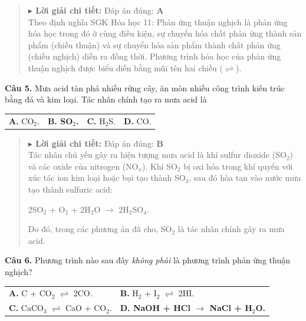 \documentclass[11pt,a4paper]{article}
\begin{document}
\begin{quote}\small
{\color{myBlue}\textbf{$\blacktriangleright$ Lời giải chi tiết:}} Đáp án đúng: \textbf{\color{red} A}\\
Theo định nghĩa SGK Hóa học 11: Phản ứng thuận nghịch là phản ứng hóa học trong đó ở cùng điều kiện, sự chuyển hóa chất phản ứng thành sản phẩm (chiều thuận) và sự chuyển hóa sản phẩm thành chất phản ứng (chiều nghịch) diễn ra đồng thời. Phương trình hóa học của phản ứng thuận nghịch được biểu diễn bằng mũi tên hai chiều ($\rightleftharpoons$).
\end{quote}
\vspace{2pt}

\textbf{Câu 5.} Mưa acid tàn phá nhiều rừng cây, ăn mòn nhiều công trình kiến trúc bằng đá và kim loại. Tác nhân chính tạo ra mưa acid là

\begin{tabularx}{\textwidth}{@{}XXXX@{}}
\textbf{A.} CO$_{2}$. & \textbf{\color{red} B. SO$_{2}$.} & \textbf{C.} H$_{2}$S. & \textbf{D.} CO. \\
\end{tabularx}

\begin{quote}\small
{\color{myBlue}\textbf{$\blacktriangleright$ Lời giải chi tiết:}} Đáp án đúng: \textbf{\color{red} B}\\
Tác nhân chủ yếu gây ra hiện tượng mưa acid là khí sulfur dioxide (SO$_{2}$) và các oxide của nitrogen (NO$_{x}$). Khí SO$_{2}$ bị oxi hóa trong khí quyển với xúc tác ion kim loại hoặc bụi tạo thành SO$_{3}$, sau đó hòa tan vào nước mưa tạo thành sulfuric acid:

2SO$_{2}$ + O$_{2}$ + 2H$_{2}$O $\longrightarrow$ 2H$_{2}$SO$_{4}$.

Do đó, trong các phương án đã cho, SO$_{2}$ là tác nhân chính gây ra mưa acid.
\end{quote}
\vspace{2pt}

\textbf{Câu 6.} Phương trình nào sau đây \textit{không phải} là phương trình phản ứng thuận nghịch?

\begin{tabularx}{\textwidth}{@{}XX@{}}
\textbf{A.} C + CO$_{2}$ $\rightleftharpoons$ 2CO. & \textbf{B.} H$_{2}$ + I$_{2}$ $\rightleftharpoons$ 2HI. \\
\textbf{C.} CaCO$_{3}$ $\rightleftharpoons$ CaO + CO$_{2}$. & \textbf{\color{red} D. NaOH + HCl $\longrightarrow$ NaCl + H$_{2}$O.} \\
\end{tabularx}
\end{document}

